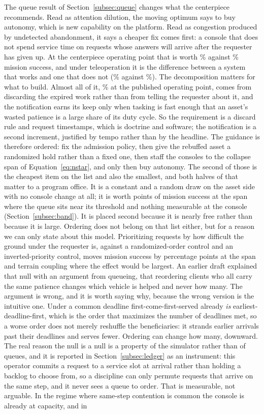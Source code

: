 \documentclass[11pt]{article}
\begin{document}
The queue result of Section~\ref{subsec:queue} changes what the centerpiece recommends. Read as attention dilution, the moving optimum says to buy autonomy, which is new capability on the platform. Read as congestion produced by undetected abandonment, it says a cheaper fix comes first: a console that does not spend service time on requests whose answers will arrive after the requester has given up. At the centerpiece operating point that is worth \qAdmitClear\% against \qBlindClear\% mission success, and under teleoperation it is the difference between a system that works and one that does not (\qTeleAdmitClear\% against \qTeleBlindClear\%). The decomposition matters for what to build. Almost all of it, \qRefundShare\% at the published operating point, comes from discarding the expired work rather than from telling the requester about it, and the notification earns its keep only when tasking is fast enough that an asset's wasted patience is a large share of its duty cycle. So the requirement is a discard rule and request timestamps, which is doctrine and software; the notification is a second increment, justified by tempo rather than by the headline. The guidance is therefore ordered: fix the admission policy, then give the rebuffed asset a randomized hold rather than a fixed one, then staff the consoles to the collapse span of Equation~\ref{eq:nstar}, and only then buy autonomy. The second of those is the cheapest item on the list and also the smallest, and both halves of that matter to a program office. It is a constant and a random draw on the asset side with no console change at all; it is worth \jcSuccBest{} points of mission success at the span where the queue sits near its threshold and nothing measurable at the console (Section~\ref{subsec:band}). It is placed second because it is nearly free rather than because it is large. Ordering does not belong on that list either, but for a reason we can only state about this model. Prioritizing requests by how difficult the ground under the requester is, against a randomized-order control and an inverted-priority control, moves mission success by \qTriageSpread{} percentage points at the span and terrain coupling where the effect would be largest. An earlier draft explained that null with an argument from queueing, that reordering clients who all carry the same patience changes which vehicle is helped and never how many. The argument is wrong, and it is worth saying why, because the wrong version is the intuitive one. Under a common deadline first-come-first-served already \emph{is} earliest-deadline-first, which is the order that maximizes the number of deadlines met, so a worse order does not merely reshuffle the beneficiaries: it strands earlier arrivals past their deadlines and serves fewer. Ordering can change how many, downward. The real reason the null is a null is a property of the simulator rather than of queues, and it is reported in Section~\ref{subsec:ledger} as an instrument: this operator commits a request to a service slot at arrival rather than holding a backlog to choose from, so a discipline can only permute requests that arrive on the same step, and it never sees a queue to order. That is measurable, not arguable. In the regime where same-step contention is common the console is already at capacity, and in 
\end{document}
